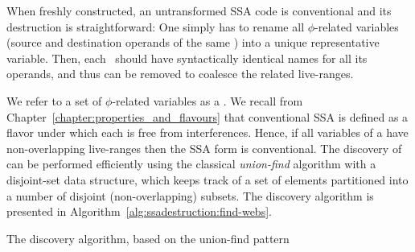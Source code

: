 {When freshly constructed, an untransformed SSA code is conventional and its destruction is straightforward:
One simply has to rename all 
$\phi$-related variables (source and destination operands of
the same \phifun)
into a unique representative variable.
Then, each \phifun\ should have syntactically identical
names for all its operands,
and thus can be removed to coalesce the related live-ranges.

We refer to a set of $\phi$-related variables as
a \phiweb\index{\phiweb}. We recall from
Chapter~\ref{chapter:properties_and_flavours}
that conventional SSA is defined as a flavor under which each
\phiweb is free from interferences.
Hence, if all variables of a \phiweb{}
have non-overlapping live-ranges then the SSA form is conventional.
The discovery of \phiwebs can be performed efficiently 
using the classical \textit{union-find} algorithm 
with a disjoint-set data structure,
which keeps track of a set of elements
partitioned into a number of disjoint (non-overlapping) subsets.
The \phiwebs discovery algorithm is presented in 
Algorithm~\ref{alg:ssadestruction:find-webs}.

\begin{algorithm}
\caption{\label{alg:ssadestruction:find-webs}The \phiwebs discovery algorithm, 
based on the union-find pattern}
\end{algorithm}


}
